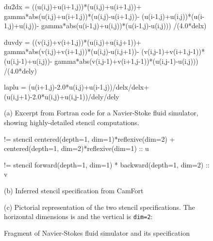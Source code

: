 \documentclass[9pt]{sigplanconf}
\theoremstyle{definition}
\begin{document}
\begin{figure}[t]
\begin{ExmVerbatim}[firstnumber=20]
du2dx = ((u(i,j)+u(i+1,j))*(u(i,j)+u(i+1,j))+
    gamma*abs(u(i,j)+u(i+1,j))*(u(i,j)-u(i+1,j))-
    (u(i-1,j)+u(i,j))*(u(i-1,j)+u(i,j))-
    gamma*abs(u(i-1,j)+u(i,j))*(u(i-1,j)-u(i,j)))
    /(4.0*delx)

duvdy = ((v(i,j)+v(i+1,j))*(u(i,j)+u(i,j+1))+
   gamma*abs(v(i,j)+v(i+1,j))*(u(i,j)-u(i,j+1))-
   (v(i,j-1)+v(i+1,j-1))*(u(i,j-1)+u(i,j))-
   gamma*abs(v(i,j-1)+v(i+1,j-1))*(u(i,j-1)-u(i,j)))
   /(4.0*dely)

laplu = (u(i+1,j)-2.0*u(i,j)+u(i-1,j))/delx/delx+
          (u(i,j+1)-2.0*u(i,j)+u(i,j-1))/dely/dely
\end{ExmVerbatim}
(a) Excerpt from Fortran code for a Navier-Stoke fluid simulator,
showing highly-detailed stencil computations. \\


\begin{SpecVerbatim}[xleftmargin=0cm]
!= stencil centered(depth=1, dim=1)*reflexive(dim=2)
         + centered(depth=1, dim=2)*reflexive(dim=1) :: u

!= stencil forward(depth=1, dim=1)
         * backward(depth=1, dim=2) :: v
\end{SpecVerbatim}
(b) Inferred stencil specification from CamFort

\begin{center}
\end{center}
(c) Pictorial representation of the two stencil specifications.
The horizontal dimensions is  and the vertical is \texttt{dim=2}:
\caption{Fragment of Navier-Stokes fluid simulator and its specification}
\label{ref:navier-stokes-fragment}
\end{figure}
\end{document}
